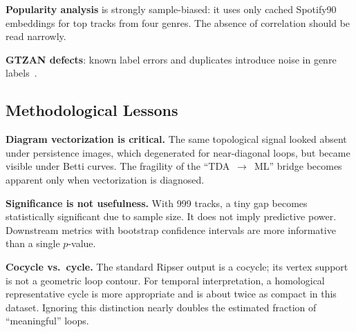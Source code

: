 \textbf{Popularity analysis} is strongly sample-biased: it uses only cached Spotify90 embeddings for top tracks from four genres. The absence of correlation should be read narrowly.

\textbf{GTZAN defects}: known label errors and duplicates introduce noise in genre labels~\cite{sturm2013gtzan}.

\subsection{Methodological Lessons}

\textbf{Diagram vectorization is critical.} The same topological signal looked absent under persistence images, which degenerated for near-diagonal loops, but became visible under Betti curves. The fragility of the ``TDA~$\to$~ML'' bridge becomes apparent only when vectorization is diagnosed.

\textbf{Significance is not usefulness.} With 999 tracks, a tiny gap becomes statistically significant due to sample size. It does not imply predictive power. Downstream metrics with bootstrap confidence intervals are more informative than a single $p$-value.

\textbf{Cocycle vs.\ cycle.} The standard Ripser output is a cocycle; its vertex support is not a geometric loop contour. For temporal interpretation, a homological representative cycle is more appropriate and is about twice as compact in this dataset. Ignoring this distinction nearly doubles the estimated fraction of ``meaningful'' loops.
